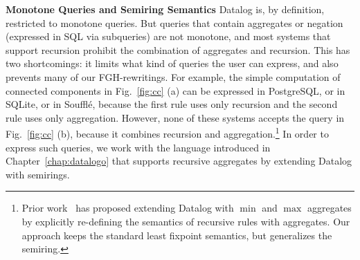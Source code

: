 

{\bf Monotone Queries and Semiring Semantics} Datalog is, by
definition, restricted to monotone queries.
But queries that contain aggregates or negation
(expressed in SQL via subqueries) are not monotone, and most systems
that support recursion prohibit the combination of aggregates and
recursion.  This has two shortcomings: it limits what kind of queries
the user can express, and also prevents many of our FGH-rewritings.
For example, the simple computation of connected components in
Fig.~\ref{fig:cc} (a) can be expressed in PostgreSQL, or in SQLite, or
in Soufflé,
because the first rule uses
only recursion and the second rule uses only aggregation.  However,
none of these systems accepts the query in Fig.~\ref{fig:cc} (b),
because it combines recursion and aggregation.\footnote{Prior
  work~\cite{DBLP:conf/pods/GangulyGZ91,DBLP:journals/tkde/SeoGL15}
  has proposed extending Datalog with $\min$ and $\max$ aggregates by
  explicitly re-defining the semantics of recursive rules with
  aggregates.  Our approach keeps the standard least fixpoint
  semantics, but generalizes the semiring.}  
In order to express such queries, we work with the \datalogo
 language introduced in Chapter~\ref{chap:datalogo}
that supports recursive aggregates by extending Datalog with semirings.

